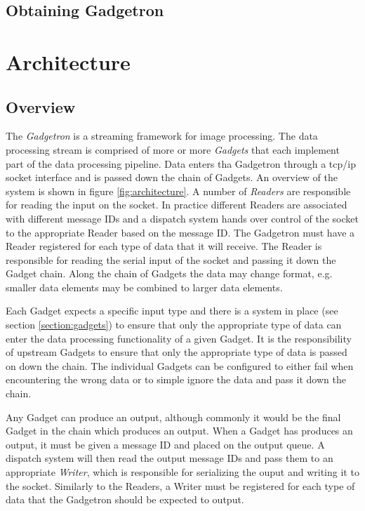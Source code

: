 \documentclass[11pt]{article}
\begin{document}
\subsection{Obtaining Gadgetron}

\section{Architecture}

\subsection{Overview}
The \emph{Gadgetron} is a streaming framework for image processing. The data processing stream is comprised of more or more \emph{Gadgets} that each implement part of the data processing pipeline. Data enters tha Gadgetron through a tcp/ip socket interface and is passed down the chain of Gadgets. An overview of the system is shown in figure \ref{fig:architecture}. A number of \emph{Readers} are responsible for reading the input on the socket. In practice different Readers are associated with different message IDs and a dispatch system hands over control of the socket to the appropriate Reader based on the message ID. The Gadgetron must have a Reader registered for each type of data that it will receive. The Reader is responsible for reading the serial input of the socket and passing it down the Gadget chain. Along the chain of Gadgets the data may change format, e.g. smaller data elements may be combined to larger data elements. 

Each Gadget expects a specific input type and there is a system in place (see section \ref{section:gadgets}) to ensure that only the appropriate type of data can enter the data processing functionality of a given Gadget. It is the responsibility of upstream Gadgets to ensure that only the appropriate type of data is passed on down the chain. The individual Gadgets can be configured to either fail when encountering the wrong data or to simple ignore the data and pass it down the chain. 

Any Gadget can produce an output, although commonly it would be the final Gadget in the chain which produces an output. When a Gadget has produces an output, it must be given a message ID and placed on the output queue. A dispatch system will then read the output message IDs and pass them to an appropriate \emph{Writer}, which is responsible for serializing the ouput and writing it to the socket. Similarly to the Readers, a Writer must be registered for each type of data that the Gadgetron should be expected to output. 
\end{document}
